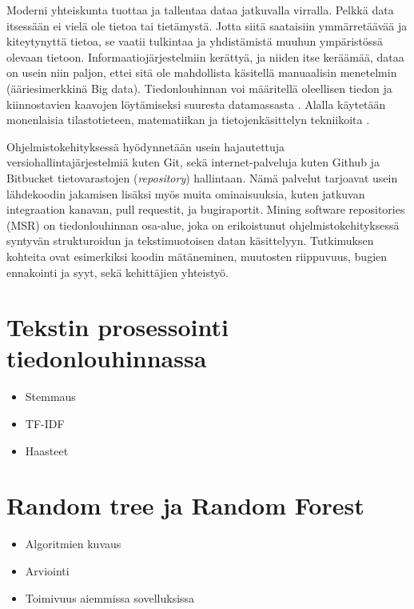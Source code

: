 \documentclass[utf8]{gradu3}
\begin{document}
Moderni yhteiskunta tuottaa ja tallentaa dataa jatkuvalla virralla. Pelkkä data
itsessään ei vielä ole tietoa tai tietämystä. Jotta siitä saataisiin
ymmärretäävää ja kiteytynyttä tietoa, se vaatii tulkintaa ja yhdistämistä muuhun
ympäristössä olevaan tietoon. %
Informaatiojärjestelmiin kerättyä, ja niiden itse keräämää, dataa on usein niin
paljon, ettei sitä ole mahdollista käsitellä manuaalisin menetelmin
(ääriesimerkkinä Big data). Tiedonlouhinnan voi määritellä oleellisen tiedon ja
kiinnostavien kaavojen löytämiseksi suuresta datamassasta
\parencite[][8]{han-data_mining}. Alalla käytetään monenlaisia tilastotieteen,
matematiikan ja tietojenkäsittelyn tekniikoita \parencite{clifton-2019}. 

Ohjelmistokehityksessä hyödynnetään usein hajautettuja
versiohallintajärjestelmiä kuten Git, sekä internet-palveluja kuten Github ja
Bitbucket tietovarastojen (\textit{repository}) hallintaan. Nämä palvelut
tarjoavat usein lähdekoodin jakamisen lisäksi myös muita ominaisuuksia, kuten
jatkuvan integraation kanavan, pull requestit, ja bugiraportit. Mining software
repositories (MSR) on tiedonlouhinnan osa-alue, joka on erikoistunut
ohjelmistokehityksessä syntyvän strukturoidun ja tekstimuotoisen datan
käsittelyyn. Tutkimuksen kohteita ovat esimerkiksi koodin mätäneminen, muutosten
riippuvuus, bugien ennakointi ja syyt, sekä kehittäjien yhteistyö.
\parencite{guemes-pena-emerging_topics}

\section{Tekstin prosessointi tiedonlouhinnassa}
 \begin{itemize}
   \item Stemmaus
   \item TF-IDF
   \item Haasteet
 \end{itemize}
\section{Random tree ja Random Forest}
\begin{itemize}
  \item Algoritmien kuvaus
  \item Arviointi
  \item Toimivuus aiemmissa sovelluksissa
\end{itemize}
\end{document}

